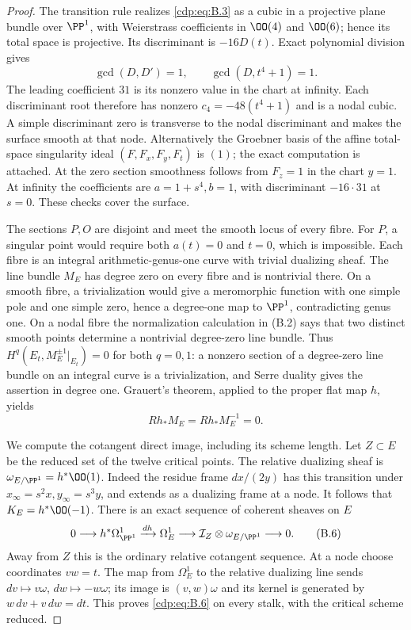 \begin{proof}
The transition rule realizes \eqref{cdp:eq:B.3} as a cubic in a projective plane bundle over $\PP^1$, with Weierstrass coefficients in $\OO(4)$ and $\OO(6)$; hence its total space is projective. Its discriminant is $-16D(t)$. Exact polynomial division gives
\[
 \gcd(D,D')=1,\qquad \gcd(D,t^4+1)=1.
\]
The leading coefficient $31$ is its nonzero value in the chart at infinity. Each discriminant root therefore has nonzero $c_4=-48(t^4+1)$ and is a nodal cubic. A simple discriminant zero is transverse to the nodal discriminant and makes the surface smooth at that node. Alternatively the Groebner basis of the affine total-space singularity ideal $(F,F_x,F_y,F_t)$ is $(1)$; the exact computation is attached. At the zero section smoothness follows from $F_z=1$ in the chart $y=1$. At infinity the coefficients are $a=1+s^4,b=1$, with discriminant $-16\cdot31$ at $s=0$. These checks cover the surface.

The sections $P,O$ are disjoint and meet the smooth locus of every fibre. For $P$, a singular point would require both $a(t)=0$ and $t=0$, which is impossible. Each fibre is an integral arithmetic-genus-one curve with trivial dualizing sheaf. The line bundle $M_E$ has degree zero on every fibre and is nontrivial there. On a smooth fibre, a trivialization would give a meromorphic function with one simple pole and one simple zero, hence a degree-one map to $\PP^1$, contradicting genus one. On a nodal fibre the normalization calculation in (B.2) says that two distinct smooth points determine a nontrivial degree-zero line bundle. Thus $H^q(E_t,M_E^{\pm1}|_{E_t})=0$ for both $q=0,1$: a nonzero section of a degree-zero line bundle on an integral curve is a trivialization, and Serre duality gives the assertion in degree one. Grauert's theorem, applied to the proper flat map $h$, yields
\[
 Rh_*M_E=Rh_*M_E^{-1}=0.                               \tag{B.5}\label{cdp:eq:B.5}
\]

We compute the cotangent direct image, including its scheme length. Let $Z\subset E$ be the reduced set of the twelve critical points. The relative dualizing sheaf is $\omega_{E/\PP^1}=h^*\OO(1)$. Indeed the residue frame $dx/(2y)$ has this transition under $x_\infty=s^2x,y_\infty=s^3y$, and extends as a dualizing frame at a node. It follows that $K_E=h^*\OO(-1)$. There is an exact sequence of coherent sheaves on $E$
\[
0\longrightarrow h^*\Omega^1_{\PP^1}
 \xrightarrow{dh}\Omega^1_E
 \longrightarrow\mathcal I_Z\otimes\omega_{E/\PP^1}
 \longrightarrow0.                                   \tag{B.6}\label{cdp:eq:B.6}
\]
Away from $Z$ this is the ordinary relative cotangent sequence. At a node choose coordinates $vw=t$. The map from $\Omega^1_E$ to the relative dualizing line sends $dv\mapsto v\omega$, $dw\mapsto-w\omega$; its image is $(v,w)\omega$ and its kernel is generated by $w\,dv+v\,dw=dt$. This proves \eqref{cdp:eq:B.6} on every stalk, with the critical scheme reduced.


\end{proof}
